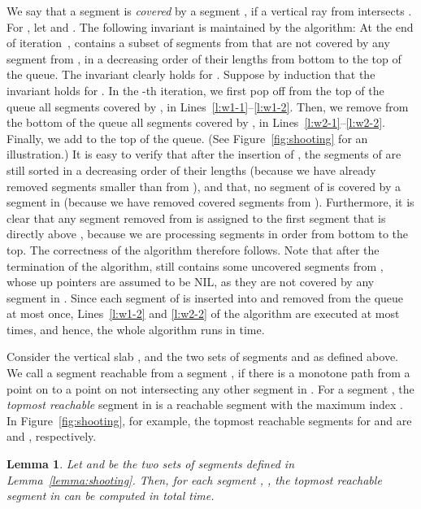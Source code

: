 \documentclass[12pt]{dalthesis}
\def\favoritefont{\bfseries \sffamily}
\def\QED{\ensuremath{{\Box}}}
\def\markatright#1{\leavevmode\unskip\nobreak\quad\hspace*{\fill}{#1}}
\newenvironment{proof}
	{\begin{trivlist}\item[\hskip\labelsep{\favoritefont Proof:}]}
	{\markatright{\QED}\end{trivlist}}
\newtheorem{lemma}[theorem]{Lemma}
\newcommand{\qed}{}
\begin{document}
\begin{proof}
	We say that a segment 
	is \emph{covered} by a segment ,
	if a vertical ray from  intersects .	
	For  ,
	let  and .
	The following invariant is maintained by the algorithm:
	At the end of iteration~, 
	 contains a subset of segments from 
	that are not covered by any segment from ,
	in a decreasing order of their lengths from bottom to the top of the queue.
	The invariant clearly holds for .
	Suppose by induction that the invariant holds for .
	In the -th iteration,
	we first pop off from the top of the queue all segments
	covered by , in Lines~\ref{l:w1-1}--\ref{l:w1-2}.
	Then, we remove from the bottom of the queue all
	segments covered by , in Lines~\ref{l:w2-1}--\ref{l:w2-2}.
	Finally, we add  to the top of the queue.
	(See Figure~\ref{fig:shooting} for an illustration.)
	It is easy to verify that after the insertion of ,
	the segments of  are still sorted in a decreasing order of their lengths
	(because we have already removed segments smaller than  from ),
	and that, no segment of  is covered by a segment in 
	(because we have removed covered segments from ).
	Furthermore, it is clear that any segment  removed from 
	is assigned to the first segment that is directly above ,
	because we are processing segments in order from bottom to the top.
	The correctness of the algorithm therefore follows.
	Note that after the termination of the algorithm,
	 still contains some uncovered segments from , whose
	up pointers are assumed to be NIL, 
	as they are not covered by any segment in .
	Since each segment of  is inserted into and removed from the queue at most once,
	Lines~\ref{l:w1-2} and \ref{l:w2-2} of the algorithm are executed at most  times,
	and hence, the whole algorithm runs in  time.
	\qed
\end{proof}

Consider the vertical slab , 
and the two sets of segments  and  as defined above. 
We call a segment  {reachable} from a segment ,
if there is a monotone path from a point on  to a point on  
not intersecting any other segment in .
For a segment , the \emph{topmost reachable} segment in  is 
a reachable segment  with the maximum index . 
In Figure~\ref{fig:shooting}, for example, 
the topmost reachable segments for  and 
are  and , respectively.

\begin{lemma} \label{lemma:top-segment}
	Let  and  be the two sets of segments  defined in Lemma~\ref{lemma:shooting}.
	Then, for each segment , , 
	the topmost reachable segment in 
	can be computed in  total time.
\end{lemma}
\end{document}
